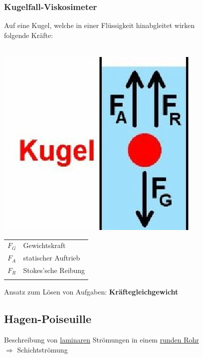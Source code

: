 \subsubsection{Kugelfall-Viskosimeter}
Auf eine Kugel, welche in einer Flüssigkeit hinabgleitet wirken \\
folgende Kräfte: \\
\\
\begin{minipage}{0.4\linewidth}
\includegraphics[width=0.8\linewidth]{Bilder/kugelfall-viskosimeter} \\
\end{minipage}
\hfill
\begin{minipage}{0.53\linewidth}
\begin{tabular}{ll}
$F_G$ & Gewichtskraft \\
$F_A$ & statischer Auftrieb \\
$F_R$ & Stokes'sche Reibung \\
\\
\end{tabular}

Ansatz zum Lösen von Aufgaben: \textbf{Kräftegleichgewicht}
\end{minipage}






\vfill\null
\columnbreak


\subsection{Hagen-Poiseuille}
Beschreibung von \underline{laminaren} Strömungen in einem \underline{runden Rohr} \\
$\Rightarrow$ Schichtströmung

